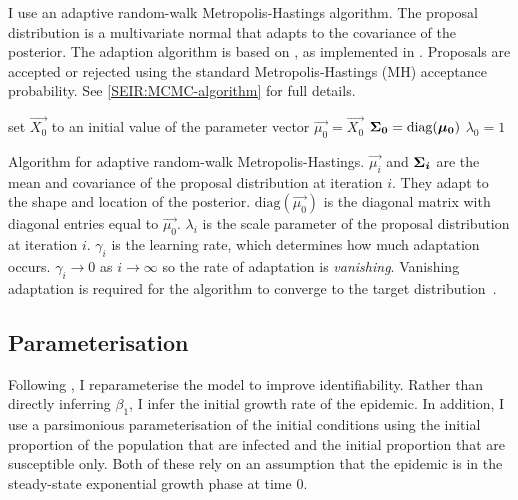 \documentclass[thesis.tex]{subfiles}
\begin{document}
I use an adaptive random-walk Metropolis-Hastings algorithm.
The proposal distribution is a multivariate normal that adapts to the covariance of the posterior.
The adaption algorithm is based on \textcite[algorithm 4]{andrieuTutorial}, as implemented in \textcite{ghoshApproximate}.
Proposals are accepted or rejected using the standard Metropolis-Hastings (MH) acceptance probability.
See \cref{SEIR:MCMC-algorithm} for full details.
\begin{algorithm}
 set $\vec{X_0}$ to an initial value of the parameter vector \;
 $\vec{\mu_0} = \vec{X_0}$ \;
 $\bm{\Sigma_0} = \text{diag}(\bm{\mu_0})$ \;
 $\lambda_0 = 1$ \;
 \caption{Algorithm for adaptive random-walk Metropolis-Hastings. $\vec{\mu_i}$ and $\bm{\Sigma_i}$ are the mean and covariance of the proposal distribution at iteration $i$. They adapt to the shape and location of the posterior. $\text{diag}(\vec{\mu_0})$ is the diagonal matrix with diagonal entries equal to $\vec{\mu_0}$. $\lambda_i$ is the scale parameter of the proposal distribution at iteration $i$. $\gamma_i$ is the learning rate, which determines how much adaptation occurs. $\gamma_i \to 0$ as $i \to \infty$ so the rate of adaptation is \emph{vanishing}. Vanishing adaptation is required for the algorithm to converge to the target distribution~\autocite[section 3]{andrieuTutorial}.}
 \label{SEIR:MCMC-algorithm}
\end{algorithm}

\subsection{Parameterisation}

Following \textcite{birrellBayesian}, I reparameterise the model to improve identifiability.
Rather than directly inferring $\beta_1$, I infer the initial growth rate of the epidemic.
In addition, I use a parsimonious parameterisation of the initial conditions using the initial proportion of the population that are infected and the initial proportion that are susceptible only.
Both of these rely on an assumption that the epidemic is in the steady-state exponential growth phase at time 0.
\end{document}
